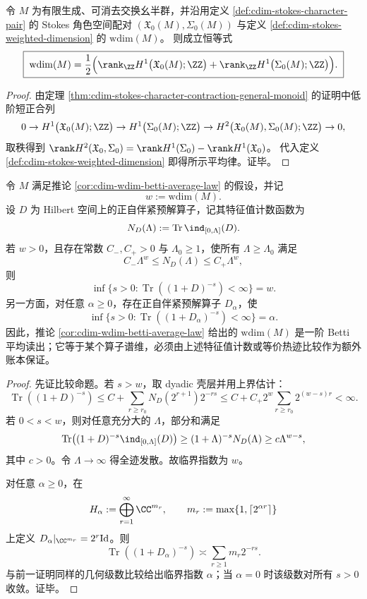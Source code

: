 
\begin{corollary}\label{cor:cdim-wdim-betti-average-law}
令 \(M\) 为有限生成、可消去交换幺半群，并沿用定义 \ref{def:cdim-stokes-character-pair} 的 Stokes 角色空间配对
\(
(\mathfrak X_0(M),\Sigma_0(M))
\)
与定义 \ref{def:cdim-stokes-weighted-dimension} 的 \(\mathrm{wdim}(M)\)。
则成立恒等式
\[
\boxed{\;
\mathrm{wdim}(M)
=\frac12\Bigl(\rank_{\ZZ}H^{1}\bigl(\mathfrak X_0(M);\ZZ\bigr)+\rank_{\ZZ}H^{1}\bigl(\Sigma_0(M);\ZZ\bigr)\Bigr).\;}
\]
\end{corollary}
\begin{proof}
由定理 \ref{thm:cdim-stokes-character-contraction-general-monoid} 的证明中低阶短正合列
\[
0\to H^{1}\bigl(\mathfrak X_0(M);\ZZ\bigr)\to H^{1}\bigl(\Sigma_0(M);\ZZ\bigr)\to H^{2}\bigl(\mathfrak X_0(M),\Sigma_0(M);\ZZ\bigr)\to 0,
\]
取秩得到
\(
\rank H^{2}(\mathfrak X_0,\Sigma_0)=\rank H^{1}(\Sigma_0)-\rank H^{1}(\mathfrak X_0)
\)。
代入定义 \ref{def:cdim-stokes-weighted-dimension} 即得所示平均律。证毕。
\end{proof}
\begin{proposition}\label{prop:distill-connes-wdim-spectral-growth-guard}
令 \(M\) 满足推论 \ref{cor:cdim-wdim-betti-average-law} 的假设，并记
\[
w:=\mathrm{wdim}(M).
\]
设 \(D\) 为 Hilbert 空间上的正自伴紧预解算子，记其特征值计数函数为
\[
N_D(\Lambda):=\operatorname{Tr}\ind_{[0,\Lambda]}(D).
\]
若 \(w>0\)，且存在常数 \(C_-,C_+>0\) 与 \(\Lambda_0\ge1\)，使所有 \(\Lambda\ge\Lambda_0\) 满足
\[
C_-\Lambda^w\le N_D(\Lambda)\le C_+\Lambda^w,
\]
则
\[
\inf\{s>0:\operatorname{Tr}((1+D)^{-s})<\infty\}=w.
\]
另一方面，对任意 \(\alpha\ge0\)，存在正自伴紧预解算子 \(D_{\alpha}\)，使
\[
\inf\{s>0:\operatorname{Tr}((1+D_{\alpha})^{-s})<\infty\}=\alpha.
\]
因此，推论 \ref{cor:cdim-wdim-betti-average-law} 给出的 \(\mathrm{wdim}(M)\) 是一阶 Betti 平均读出；它等于某个算子谱维，必须由上述特征值计数或等价热迹比较作为额外账本保证。
\end{proposition}
\begin{proof}
先证比较命题。若 \(s>w\)，取 dyadic 壳层并用上界估计：
\[
\operatorname{Tr}((1+D)^{-s})\le C+\sum_{r\ge r_0}N_D(2^{r+1})2^{-rs}\le C+C_+2^w\sum_{r\ge r_0}2^{(w-s)r}<\infty.
\]
若 \(0<s<w\)，则对任意充分大的 \(\Lambda\)，部分和满足
\[
\operatorname{Tr}\bigl((1+D)^{-s}\ind_{[0,\Lambda]}(D)\bigr)
\ge (1+\Lambda)^{-s}N_D(\Lambda)
\ge c\Lambda^{w-s},
\]
其中 \(c>0\)。令 \(\Lambda\to\infty\) 得全迹发散。故临界指数为 \(w\)。

对任意 \(\alpha\ge0\)，在
\[
H_{\alpha}:=\bigoplus_{r=1}^{\infty}\CC^{m_r},\qquad
m_r:=\max\{1,\lceil 2^{\alpha r}\rceil\}
\]
上定义 \(D_{\alpha}|_{\CC^{m_r}}=2^r\mathrm{Id}\)。则
\[
\operatorname{Tr}((1+D_{\alpha})^{-s})\asymp
\sum_{r\ge1}m_r2^{-rs}.
\]
与前一证明同样的几何级数比较给出临界指数 \(\alpha\)；当 \(\alpha=0\) 时该级数对所有 \(s>0\) 收敛。证毕。
\end{proof}
